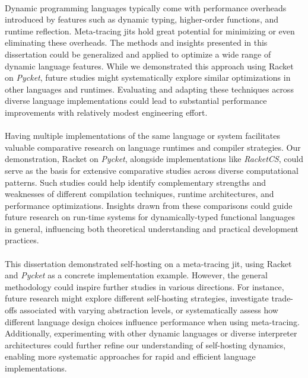         \paragraph{}%
            Dynamic programming languages typically come with performance overheads introduced by features such as dynamic typing, higher-order functions, and runtime reflection. Meta-tracing \glspl{jit} hold great potential for minimizing or even eliminating these overheads. The methods and insights presented in this dissertation could be generalized and applied to optimize a wide range of dynamic language features. While we demonstrated this approach using Racket on \emph{Pycket}, future studies might systematically explore similar optimizations in other languages and runtimes. Evaluating and adapting these techniques across diverse language implementations could lead to substantial performance improvements with relatively modest engineering effort.

        \paragraph{}%
            Having multiple implementations of the same language or system facilitates valuable comparative research on language runtimes and compiler strategies. Our demonstration, Racket on \emph{Pycket}, alongside implementations like \emph{RacketCS}, could serve as the basis for extensive comparative studies across diverse computational patterns. Such studies could help identify complementary strengths and weaknesses of different compilation techniques, runtime architectures, and performance optimizations. Insights drawn from these comparisons could guide future research on run-time systems for dynamically-typed functional languages in general, influencing both theoretical understanding and practical development practices.

        \paragraph{}%
            This dissertation demonstrated self-hosting on a meta-tracing \gls{jit}, using Racket and \emph{Pycket} as a concrete implementation example. However, the general methodology could inspire further studies in various directions. For instance, future research might explore different self-hosting strategies, investigate trade-offs associated with varying abstraction levels, or systematically assess how different language design choices influence performance when using meta-tracing. Additionally, experimenting with other dynamic languages or diverse interpreter architectures could further refine our understanding of self-hosting dynamics, enabling more systematic approaches for rapid and efficient language implementations.

